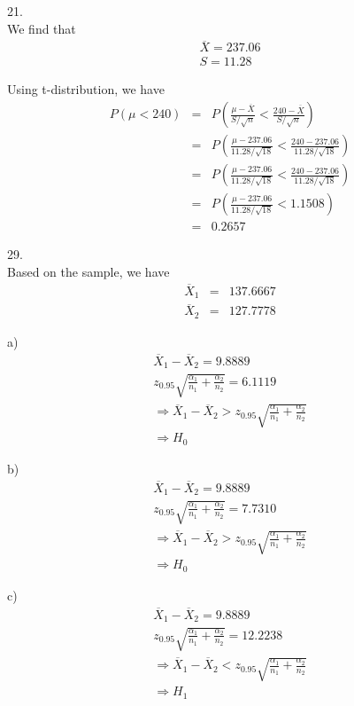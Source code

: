 \documentclass[12pt]{article}
\begin{document}
21. \\

We find that
\begin{eqnarray*}
  \overline{X} = 237.06 \\
  S = 11.28
\end{eqnarray*}

Using t-distribution, we have
\begin{eqnarray*}
  P \left( \mu < 240  \right)
  &=& P \left( \frac{\mu - \overline{X}}{S / \sqrt{n}}
    < \frac{240 - \overline{X}}{S / \sqrt{n}} \right) \\
  &=& P \left( \frac{\mu - 237.06}{11.28 / \sqrt{18}}
    < \frac{240 - 237.06}{11.28 / \sqrt{18}} \right) \\
  &=& P \left( \frac{\mu - 237.06}{11.28 / \sqrt{18}}
    < \frac{240 - 237.06}{11.28 / \sqrt{18}} \right) \\
  &=& P \left( \frac{\mu - 237.06}{11.28 / \sqrt{18}} < 1.1508 \right) \\
  &=& 0.2657
\end{eqnarray*}

29. \\

Based on the sample, we have
\begin{eqnarray*}
  \overline{X}_1 &=& 137.6667 \\
  \overline{X}_2 &=& 127.7778
\end{eqnarray*}

a)
\begin{eqnarray*}
  \overline{X}_1 - \overline{X}_2 = 9.8889 \\
  z_{0.95} \sqrt { \frac {\alpha_1}{n_1} + \frac {\alpha_2}{n_2}}
  = 6.1119 \\
  \Rightarrow \overline{X}_1 - \overline{X}_2
  > z_{0.95} \sqrt { \frac {\alpha_1}{n_1} + \frac {\alpha_2}{n_2}} \\
  \Rightarrow H_0 
\end{eqnarray*}

b)
\begin{eqnarray*}
  \overline{X}_1 - \overline{X}_2 = 9.8889 \\
  z_{0.95} \sqrt { \frac {\alpha_1}{n_1} + \frac {\alpha_2}{n_2}}
  = 7.7310 \\
  \Rightarrow \overline{X}_1 - \overline{X}_2
  > z_{0.95} \sqrt { \frac {\alpha_1}{n_1} + \frac {\alpha_2}{n_2}} \\
  \Rightarrow H_0 
\end{eqnarray*}

c)
\begin{eqnarray*}
  \overline{X}_1 - \overline{X}_2 = 9.8889 \\
  z_{0.95} \sqrt { \frac {\alpha_1}{n_1} + \frac {\alpha_2}{n_2}}
  = 12.2238 \\
  \Rightarrow \overline{X}_1 - \overline{X}_2
  < z_{0.95} \sqrt { \frac {\alpha_1}{n_1} + \frac {\alpha_2}{n_2}} \\
  \Rightarrow H_1
\end{eqnarray*}
\end{document}

